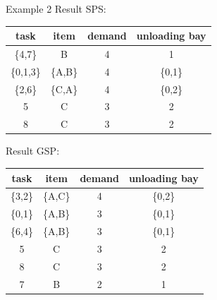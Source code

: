     \begin{frame}[fragile]{Example 2}
        Result SPS:
            \begin{center}
              \begin{tabular}{|c|c|c|c|} \hline
              \textbf{task} & \textbf{item} & \textbf{demand} & \textbf{unloading bay} \\ \hline
              \{4,7\}    & B    & 4     & 1             \\
              \{0,1,3\}  & \{A,B\}& 4    & \{0,1\}             \\
              \{2,6\}    & \{C,A\}    & 4  & \{0,2\}             \\
              5    & C    & 3      & 2             \\
              8    & C    & 3      & 2             \\ \hline       
              \end{tabular}
              
            \end{center}
        Result GSP:
            \begin{center}
              \begin{tabular}{|c|c|c|c|} \hline
              \textbf{task} & \textbf{item} & \textbf{demand} & \textbf{unloading bay} \\ \hline
              \{3,2\}    & \{A,C\}    & 4     & \{0,2\}             \\
              \{0,1\}    & \{A,B\}    & 3     & \{0,1\}             \\
              \{6,4\}    & \{A,B\}    & 3     & \{0,1\}             \\
              5    & C    & 3      & 2             \\
              8    & C    & 3      & 2             \\        
              7    & B    & 2      & 1             \\\hline
              \end{tabular}
              
            \end{center}
       
    \end{frame}


